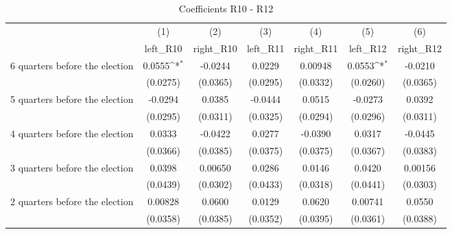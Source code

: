\begin{table}[htbp]\centering
\def\sym#1{\ifmmode^{#1}\else\(^{#1}\)\fi}
\caption{Coefficients R10 - R12}
\begin{tabular}{l*{6}{c}}
\hline\hline
                    &\multicolumn{1}{c}{(1)}&\multicolumn{1}{c}{(2)}&\multicolumn{1}{c}{(3)}&\multicolumn{1}{c}{(4)}&\multicolumn{1}{c}{(5)}&\multicolumn{1}{c}{(6)}\\
                    &\multicolumn{1}{c}{left\_R10}&\multicolumn{1}{c}{right\_R10}&\multicolumn{1}{c}{left\_R11}&\multicolumn{1}{c}{right\_R11}&\multicolumn{1}{c}{left\_R12}&\multicolumn{1}{c}{right\_R12}\\
\hline
 6 quarters before the election&      0.0555\sym{*}  &     -0.0244         &      0.0229         &     0.00948         &      0.0553\sym{*}  &     -0.0210         \\
                    &    (0.0275)         &    (0.0365)         &    (0.0295)         &    (0.0332)         &    (0.0260)         &    (0.0365)         \\
[1em]
 5 quarters before the election&     -0.0294         &      0.0385         &     -0.0444         &      0.0515         &     -0.0273         &      0.0392         \\
                    &    (0.0295)         &    (0.0311)         &    (0.0325)         &    (0.0294)         &    (0.0296)         &    (0.0311)         \\
[1em]
 4 quarters before the election&      0.0333         &     -0.0422         &      0.0277         &     -0.0390         &      0.0317         &     -0.0445         \\
                    &    (0.0366)         &    (0.0385)         &    (0.0375)         &    (0.0375)         &    (0.0367)         &    (0.0383)         \\
[1em]
 3 quarters before the election&      0.0398         &     0.00650         &      0.0286         &      0.0146         &      0.0420         &     0.00156         \\
                    &    (0.0439)         &    (0.0302)         &    (0.0433)         &    (0.0318)         &    (0.0441)         &    (0.0303)         \\
[1em]
 2 quarters before the election&     0.00828         &      0.0600         &      0.0129         &      0.0620         &     0.00741         &      0.0550         \\
                    &    (0.0358)         &    (0.0385)         &    (0.0352)         &    (0.0395)         &    (0.0361)         &    (0.0388)         \\

\end{tabular}
\end{table}
